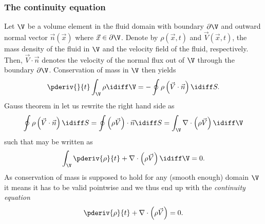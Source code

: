 \subsubsection{The continuity equation}
Let $\V$ be a volume element in the fluid domain with boundary $\partial \V$ and outward normal vector $\vec{n}(\vec{x})$ where $\vec{x}\in\partial\V$. Denote by $\rho(\vec{x},t)$ and $\vec{V}(\vec{x},t)$, the mass density of the fluid in $\V$ and the velocity field of the fluid, respectively. Then, $\vec{V}\cdot\vec{n}$ denotes the velocity of the normal flux out of $\V$ through the boundary $\partial \V$. Conservation of mass in $\V$ then yields
\begin{equation}\label{Eq2:conservationOfMass}
	\pderiv{}{t}\int_\V \rho\idiff\V = -\oint \rho\left(\vec{V}\cdot \vec{n}\right)\idiff S.
\end{equation}
Gauss theorem in  let us rewrite the right hand side as
\begin{equation*}
	\oint \rho\left(\vec{V}\cdot \vec{n}\right)\idiff S = \oint \left(\rho\vec{V}\right)\cdot\vec{n}\idiff S = \int_\V\nabla\cdot \left(\rho\vec{V}\right)\idiff\V
\end{equation*}
such that  may be written as
\begin{equation*}
	\int_\V \pderiv{\rho}{t}+\nabla\cdot\left(\rho\vec{V}\right)\idiff\V = 0.
\end{equation*}
As conservation of mass is supposed to hold for any (smooth enough) domain $\V$ it means it has to be valid pointwise and we thus end up with the \textit{continuity equation}
\begin{equation}\label{Eq2:continuityEquation}
	 \pderiv{\rho}{t}+\nabla\cdot\left(\rho\vec{V}\right) = 0.
\end{equation}

